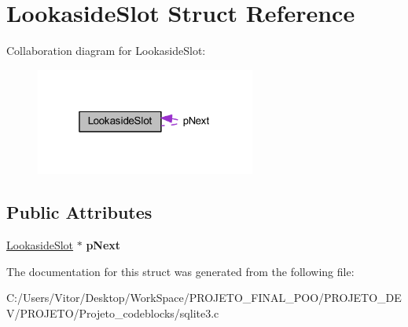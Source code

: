 \hypertarget{struct_lookaside_slot}{\section{Lookaside\-Slot Struct Reference}
\label{struct_lookaside_slot}
}


Collaboration diagram for Lookaside\-Slot\-:\nopagebreak
\begin{figure}[H]
\begin{center}
\leavevmode
\includegraphics[width=205pt]{struct_lookaside_slot__coll__graph}
\end{center}
\end{figure}
\subsection*{Public Attributes}
\begin{DoxyCompactItemize}
\item 
\hypertarget{struct_lookaside_slot_a3c3dd4a770ded51a68e8a651eba40f66}{\hyperlink{struct_lookaside_slot}{Lookaside\-Slot} $\ast$ {\bfseries p\-Next}}\label{struct_lookaside_slot_a3c3dd4a770ded51a68e8a651eba40f66}

\end{DoxyCompactItemize}


The documentation for this struct was generated from the following file\-:\begin{DoxyCompactItemize}
\item 
C\-:/\-Users/\-Vitor/\-Desktop/\-Work\-Space/\-P\-R\-O\-J\-E\-T\-O\-\_\-\-F\-I\-N\-A\-L\-\_\-\-P\-O\-O/\-P\-R\-O\-J\-E\-T\-O\-\_\-\-D\-E\-V/\-P\-R\-O\-J\-E\-T\-O/\-Projeto\-\_\-codeblocks/sqlite3.\-c\end{DoxyCompactItemize}
